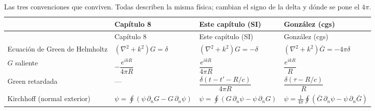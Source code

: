 \documentclass[
  spanish,
  a4paper,
]{scrbook}
\theoremstyle{definition}
\theoremstyle{plain}
\theoremstyle{definition}
\theoremstyle{plain}
\theoremstyle{definition}
\theoremstyle{remark}
\begin{document}
\begin{longtable}[]{@{}
  >{\raggedright\arraybackslash}p{}
  >{\raggedright\arraybackslash}p{}
  >{\raggedright\arraybackslash}p{}
  >{\raggedright\arraybackslash}p{}@{}}
\caption{Las tres convenciones que conviven. Todas describen la misma
física; cambian el signo de la delta y dónde se pone el
\(4\pi\).}\label{tbl-hip-convenciones-green}\tabularnewline
\toprule\noalign{}
\begin{minipage}[b]{\linewidth}\raggedright
\end{minipage} & \begin{minipage}[b]{\linewidth}\raggedright
Capítulo 8
\end{minipage} & \begin{minipage}[b]{\linewidth}\raggedright
Este capítulo (SI)
\end{minipage} & \begin{minipage}[b]{\linewidth}\raggedright
González (cgs)
\end{minipage} \\
\midrule\noalign{}
\endfirsthead
\toprule\noalign{}
\begin{minipage}[b]{\linewidth}\raggedright
\end{minipage} & \begin{minipage}[b]{\linewidth}\raggedright
Capítulo 8
\end{minipage} & \begin{minipage}[b]{\linewidth}\raggedright
Este capítulo (SI)
\end{minipage} & \begin{minipage}[b]{\linewidth}\raggedright
González (cgs)
\end{minipage} \\
\midrule\noalign{}
\endhead
\bottomrule\noalign{}
\endlastfoot
Ecuación de Green de Helmholtz & \((\nabla^2+k^2)G = \delta\) &
\((\nabla^2+k^2)G = -\delta\) &
\((\nabla^2+k^2)\bar G = -4\pi\delta\) \\
\(G\) saliente & \(-\dfrac{e^{ikR}}{4\pi R}\) &
\(\dfrac{e^{ikR}}{4\pi R}\) & \(\dfrac{e^{ikR}}{R}\) \\
Green retardada & --- & \(\dfrac{\delta(t-t'-R/c)}{4\pi R}\) &
\(\dfrac{\delta(\tau-R/c)}{R}\) \\
Kirchhoff (normal exterior) &
\(\psi = \oint(\psi\,\partial_nG - G\,\partial_n\psi)\) &
\(\psi = \oint(G\,\partial_n\psi - \psi\,\partial_nG)\) &
\(\psi = \tfrac{1}{4\pi}\oint(\bar G\,\partial_n\psi - \psi\,\partial_n\bar G)\) \\
\end{longtable}
\end{document}
